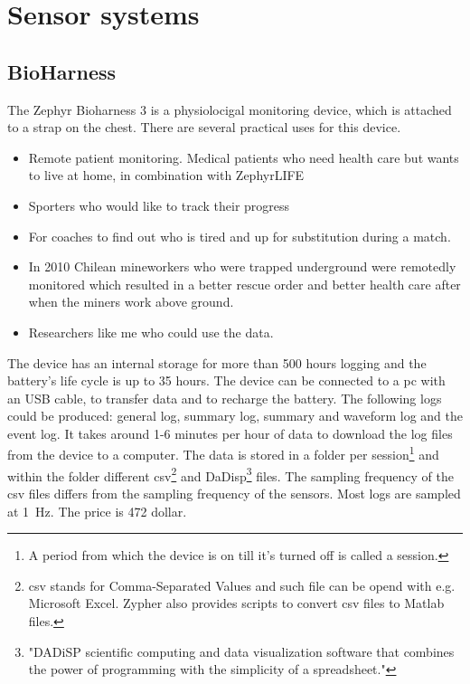 \section{Sensor systems}
	\label{sec:sensorsystems}
	\subsection{BioHarness}
			The Zephyr Bioharness 3\cite{bioharness} is a physiolocigal monitoring device, which is attached to a strap on the chest. There are several practical uses for this device.
			\begin{itemize}
				\item Remote patient monitoring. Medical patients who need health care but wants to live at home, in combination with ZephyrLIFE \texttrademark \cite{bhpatients}
				\item Sporters who would like to track their progress 
				\item For coaches to find out who is tired and up for substitution during a match. \cite{bhsport}
				\item In 2010 Chilean mineworkers who were trapped underground were remotedly monitored which resulted in a better rescue order and better health care after when the miners work above ground. \cite{chile}
				\item Researchers like me who could use the data.
			\end{itemize}

			The device has an internal storage for more than 500 hours logging and the battery's life cycle is up to 35 hours. The device can be connected to a pc with an USB cable, to transfer data and to recharge the battery. The following logs could be produced: general log, summary log, summary and waveform log and the event log. 
			It takes around 1-6 minutes per hour of data to download the log files from the device to a computer. \cite{bhdatasheet} The data is stored in a folder per session\footnote{A period from which the device is on till it's turned off is called a session.} and within the folder different csv\footnote{csv stands for Comma-Separated Values and such file can be opend with e.g. Microsoft Excel. Zypher also provides scripts to convert csv files to Matlab files.} and DaDisp\footnote{"DADiSP scientific computing and data visualization software that combines the power of programming with the simplicity of a spreadsheet."\cite{dadisp}} files. The sampling frequency of the csv files differs from the sampling frequency of the sensors. Most logs are sampled at \SI{1}{\hertz}.
			The price is 472 dollar.
		
